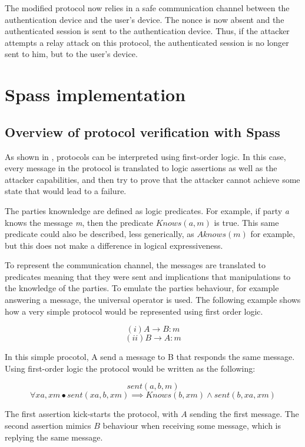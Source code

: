 \documentclass{article}
\begin{document}
	
	
	The modified protocol now relies in a safe communication channel between
	the authentication device and the user's device. The nonce is now absent
	and the authenticated session is sent to the authentication device. Thus,
	if the attacker attempts a relay attack on this protocol, the authenticated
	session is no longer sent to him, but to the user's device.

\section{Spass implementation}
\subsection{Overview of protocol verification with Spass}
	As shown in \cite{analysis}, 
	protocols can be interpreted using first-order logic. In this case, every message in the protocol
	is translated to logic assertions as well as the attacker capabilities, and then try to prove that the
	attacker cannot achieve some state that would lead to a failure.

	The parties knownledge are defined as logic predicates. For example, if party \emph{a} knows the message
	\emph{m}, then the predicate $Knows(a,m)$ is true. This same predicate could also be described, less 
	generically, as $Aknows(m)$ for example, but this does not make a difference in logical expressiveness.

	To represent the communication channel, the messages are translated to predicates meaning that they were
	sent and implications that manipulations to the knowledge of the parties. To emulate the parties behaviour,
	for example answering a message, the universal operator is used. The following example shows how a very simple
	protocol would be represented using first order logic. 

	$$ (i) A \rightarrow B:m  $$
	$$ (ii) B \rightarrow A:m $$

	In this simple procotol, A send a message to B that responds the same message. Using first-order logic the protocol
	would be written as the following:

	$$ sent(a,b,m) $$
	$$ \forall xa, xm \bullet  sent(xa,b,xm) \implies Knows(b, xm) \land  sent(b, xa, xm)$$

	The first assertion kick-starts the protocol, with $A$ sending the first message. The second assertion mimics $B$ 
	behaviour when receiving some message, which is replying the same message.
\end{document}
